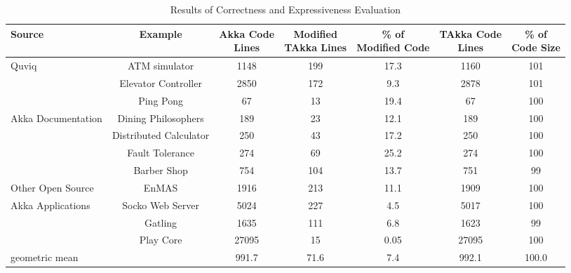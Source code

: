 \begin{table}[t]
\label{express}

\begin{center}
\begin{tabular}{| l | c | c | c |  c | c | c |}
\hline

Source & Example & \specialcell{Akka Code \\ Lines} &
\specialcell{Modified\\ TAkka Lines} & \specialcell{\% of \\Modified Code} &
\specialcell{TAkka Code\\ Lines}
& \specialcell{\% of \\Code Size} \\
\hline
Quviq & ATM simulator & 1148 & 199 & 17.3 & 1160 & 101 \\
\cline{2-7}
                                         & Elevator Controller &
2850 & 172 & 9.3 & 2878 & 101 \\
\hline


                                                               & Ping Pong & 67
& 13 & 19.4 & 67 & 100 \\
\cline{2-7}
Akka Documentation                     & Dining Philosophers & 189 & 23 & 12.1 &
189 & 100  \\
\cline{2-7}
                            & Distributed Calculator  & 250 &
43 & 17.2 & 250 & 100 \\
\cline{2-7}
                                                     & Fault Tolerance & 274 &
69 & 25.2 & 274 & 100 \\
\hline

                                                    & Barber Shop & 754 & 104 & 
13.7 & 751 & 99 \\
\cline{2-7}
Other Open Source             & EnMAS  & 1916 & 213 & 11.1 & 1909 &
100 \\
\cline{2-7}
  Akka Applications                & Socko Web Server  & 5024 & 227
& 4.5 & 5017 & 100 \\
\cline{2-7}
                                                     & Gatling
& 1635 & 111 & 6.8 & 1623 & 99 \\
\cline{2-7}
                                                     & Play Core
& 27095 & 15 & 0.05 & 27095 & 100 \\
\hline
geometric mean                   & & 991.7 & 71.6 & 7.4 & 992.1 & 100.0 \\
\hline
\end{tabular}
\caption{Results of Correctness and Expressiveness Evaluation}
\end{center}
\end{table}


